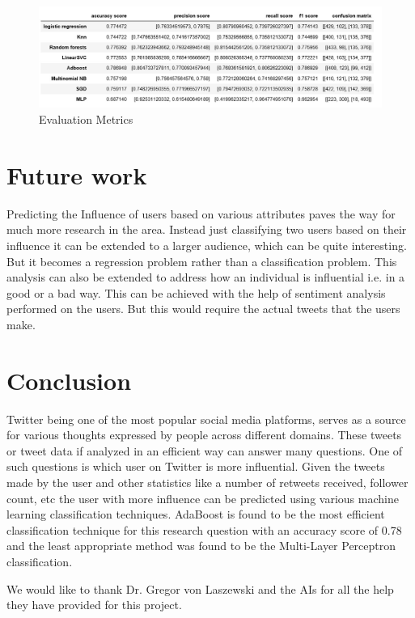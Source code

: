 \documentclass[sigconf]{acmart}
\begin{document}
\begin{figure}
\includegraphics[width=1.0\columnwidth]{images/fig5.jpeg}
\caption{Evaluation Metrics}
\label{fig:Fig5}
\end{figure}

\section{Future work}
Predicting the Influence of users based on various attributes paves the way for much more research in the area. Instead just classifying two users based on their influence it can be extended to a larger audience, which can be quite interesting. But it becomes a regression problem rather than a classification problem. This analysis can also be extended to address how an individual is influential i.e. in a good or a bad way. This can be achieved with the help of sentiment analysis performed on the users. But this would require the actual tweets that the users make.
\section{Conclusion}
Twitter being one of the most popular social media platforms, serves as a source for various thoughts expressed by people across different domains. These tweets or tweet data if analyzed in an efficient way can answer many questions. One of such questions is which user on Twitter is more influential. Given the tweets made by the user and other statistics like a number of retweets received, follower count, etc the user with more influence can be predicted using various machine learning classification techniques. AdaBoost is found to be the most efficient classification technique for this research question with an accuracy score of 0.78 and the least appropriate method was found to be the Multi-Layer Perceptron classification.  


\begin{acks}
We would like to thank Dr. Gregor von Laszewski and the AIs for all the help they have provided for this project.
\end{acks}
\end{document}
